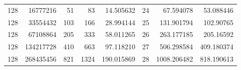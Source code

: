 \begin{longtable}[c]{@{}rrrrrrrr@{}}
    128       & 16777216  & 51        & 83       & 14.505632   & 24                  & 67.594078   & 53.088446  \\
    128       & 33554432  & 103       & 166      & 28.994144   & 25                  & 131.901794  & 102.90765  \\
    128       & 67108864  & 205       & 333      & 58.011265   & 26                  & 263.177185  & 205.16592  \\
    128       & 134217728 & 410       & 663      & 97.118210   & 27                  & 506.298584  & 409.180374 \\
    128       & 268435456 & 821       & 1324     & 190.015869  & 28                  & 1008.206482 & 818.190613 \\* \bottomrule
    \end{longtable}